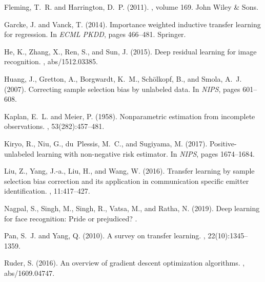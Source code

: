 \documentclass[12pt]{article}
\begin{document}
\begin{thebibliography}{}
Fleming, T.~R. and Harrington, D.~P. (2011).
, volume 169.
\newblock John Wiley \& Sons.

Garcke, J. and Vanck, T. (2014).
\newblock Importance weighted inductive transfer learning for regression.
\newblock In {\em ECML PKDD}, pages 466--481. Springer.

He, K., Zhang, X., Ren, S., and Sun, J. (2015).
\newblock Deep residual learning for image recognition.
, abs/1512.03385.

Huang, J., Gretton, A., Borgwardt, K.~M., Sch{\"o}lkopf, B., and Smola, A.~J.
  (2007).
\newblock Correcting sample selection bias by unlabeled data.
\newblock In {\em NIPS}, pages 601--608.

Kaplan, E.~L. and Meier, P. (1958).
\newblock Nonparametric estimation from incomplete observations.
,
  53(282):457--481.

Kiryo, R., Niu, G., du~Plessis, M.~C., and Sugiyama, M. (2017).
\newblock Positive-unlabeled learning with non-negative risk estimator.
\newblock In {\em NIPS}, pages 1674--1684.

Liu, Z., Yang, J.-a., Liu, H., and Wang, W. (2016).
\newblock Transfer learning by sample selection bias correction and its
  application in communication specific emitter identification.
, 11:417--427.

Nagpal, S., Singh, M., Singh, R., Vatsa, M., and Ratha, N. (2019).
\newblock Deep learning for face recognition: Pride or prejudiced?
.

Pan, S.~J. and Yang, Q. (2010).
\newblock A survey on transfer learning.
,
  22(10):1345--1359.

Ruder, S. (2016).
\newblock An overview of gradient descent optimization algorithms.
, abs/1609.04747.


\end{thebibliography}
\end{document}
